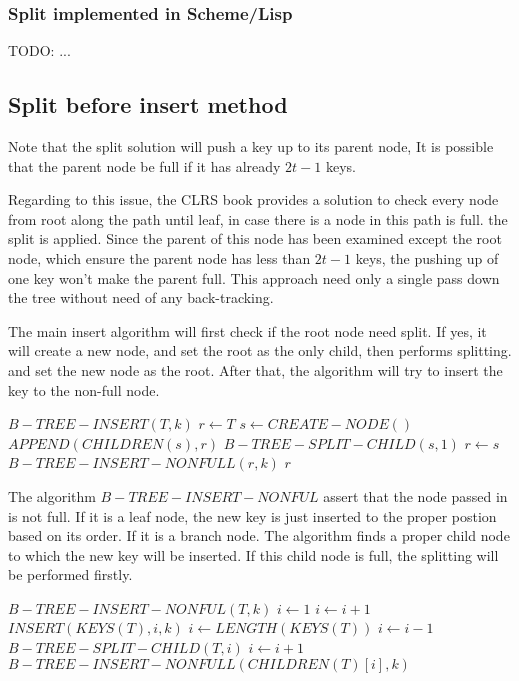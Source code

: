\documentclass{article}
\begin{document}
\subsubsection*{Split implemented in Scheme/Lisp}
TODO: ...

\subsection{Split before insert method}
\label{split before insertion}

Note that the split solution will push a key up to its parent node,
It is possible that the parent node be full if it has already 
$2t-1$ keys.

Regarding to this issue, the CLRS book provides a solution to check 
every node from root along the path until leaf, in case there is a 
node in this path is full. the split is applied. Since the parent
of this node has been examined except the root node, which ensure
the parent node has less than $2t-1$ keys, the pushing up of one
key won't make the parent full. This approach need only a single
pass down the tree without need of any back-tracking.

The main insert algorithm will first check if the root node need
split. If yes, it will create a new node, and set the root as the 
only child, then performs splitting. and set the new node as the
root. After that, the algorithm will try to insert the key to the
non-full node.

\begin{algorithmic}
\STATE $B-TREE-INSERT(T, k)$
  \STATE $r \leftarrow T$
    \STATE $s \leftarrow CREATE-NODE()$
    \STATE $APPEND(CHILDREN(s), r)$
    \STATE $B-TREE-SPLIT-CHILD(s, 1)$
    \STATE $r \leftarrow s$
  \ENDIF
  \STATE $B-TREE-INSERT-NONFULL(r, k)$
  \RETURN $r$
\end{algorithmic}

The algorithm $B-TREE-INSERT-NONFUL$ assert that the node passed in
is not full. If it is a leaf node, the new key is just inserted to 
the proper postion based on its order. If it is a branch node. The algorithm
finds a proper child node to which the new key will be inserted.
If this child node is full, the splitting will be performed firstly.

\begin{algorithmic}
\STATE $B-TREE-INSERT-NONFUL(T, k)$
    \STATE $i \leftarrow 1$
      \STATE $i \leftarrow i+1$
    \ENDWHILE
    \STATE $INSERT(KEYS(T), i, k)$
  \ELSE
    \STATE $i \leftarrow LENGTH(KEYS(T))$
      \STATE $i \leftarrow i-1$
    \ENDWHILE
      \STATE $B-TREE-SPLIT-CHILD(T, i)$
        \STATE $i \leftarrow i+1$
      \ENDIF
    \ENDIF
    \STATE $B-TREE-INSERT-NONFULL(CHILDREN(T)[i], k)$
  \ENDIF
\end{algorithmic}
\end{document}
